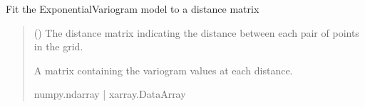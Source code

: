 \documentclass[letterpaper,10pt,english]{sphinxmanual}
\begin{document}
\begin{fulllineitems}
\begin{fulllineitems}
\label{\detokenize{covariance:glomar_gridding.variogram.ExponentialVariogram.fit}}
\pysigstartsignatures
\pysiglinewithargsret
{}
{}
{}
\pysigstopsignatures
\sphinxAtStartPar
Fit the ExponentialVariogram model to a distance matrix
\begin{quote}\begin{description}
\sphinxAtStartPar
{} (\sphinxstyleliteralemphasis{\sphinxupquote{ | }}) \textendash{} The distance matrix indicating the distance between each pair of
points in the grid.

\sphinxAtStartPar
A matrix containing the variogram values at each distance.

\sphinxAtStartPar
numpy.ndarray | xarray.DataArray

\end{description}\end{quote}

\end{fulllineitems}


\end{fulllineitems}

\end{document}
